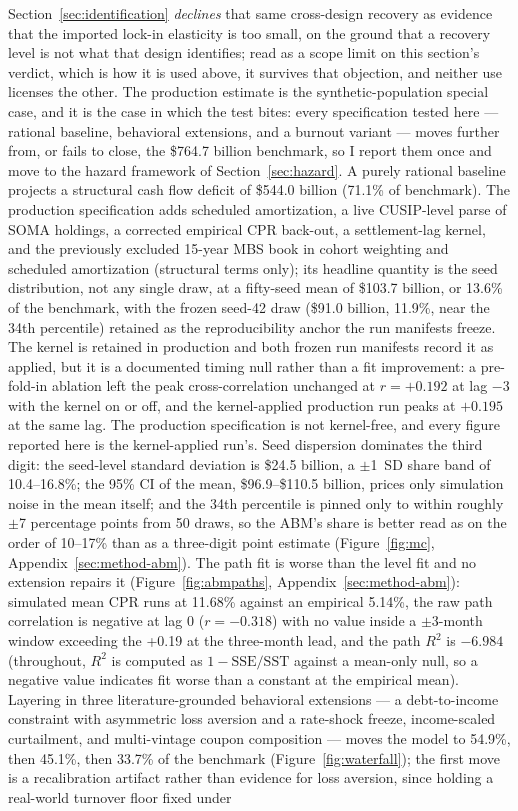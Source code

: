 \documentclass[12pt]{article}
\begin{document}
Section~\ref{sec:identification} \emph{declines} that same cross-design recovery as evidence that the imported lock-in elasticity is too small, on the ground that a recovery level is not what that design identifies; read as a scope limit on this section's verdict, which is how it is used above, it survives that objection, and neither use licenses the other. The production estimate is the synthetic-population special case, and it is the case in which the test bites: every specification tested here --- rational baseline, behavioral extensions, and a burnout variant --- moves further from, or fails to close, the \$764.7 billion benchmark, so I report them once and move to the hazard framework of Section~\ref{sec:hazard}. A purely rational baseline projects a structural cash flow deficit of \$544.0 billion (71.1\% of benchmark). The production specification adds scheduled amortization, a live CUSIP-level parse of SOMA holdings, a corrected empirical CPR back-out, a settlement-lag kernel, and the previously excluded 15-year MBS book in cohort weighting and scheduled amortization (structural terms only); its headline quantity is the seed distribution, not any single draw, at a fifty-seed mean of \$103.7 billion, or 13.6\% of the benchmark, with the frozen seed-42 draw (\$91.0 billion, 11.9\%, near the 34th percentile) retained as the reproducibility anchor the run manifests freeze. The kernel is retained in production and both frozen run manifests record it as applied, but it is a documented timing null rather than a fit improvement: a pre-fold-in ablation left the peak cross-correlation unchanged at $r = +0.192$ at lag $-3$ with the kernel on or off, and the kernel-applied production run peaks at $+0.195$ at the same lag. The production specification is not kernel-free, and every figure reported here is the kernel-applied run's. Seed dispersion dominates the third digit: the seed-level standard deviation is \$24.5 billion, a $\pm$1~SD share band of 10.4--16.8\%; the 95\% CI of the mean, \$96.9--\$110.5 billion, prices only simulation noise in the mean itself; and the 34th percentile is pinned only to within roughly $\pm$7 percentage points from 50 draws, so the ABM's share is better read as on the order of 10--17\% than as a three-digit point estimate (Figure~\ref{fig:mc}, Appendix~\ref{sec:method-abm}). The path fit is worse than the level fit and no extension repairs it (Figure~\ref{fig:abmpaths}, Appendix~\ref{sec:method-abm}): simulated mean CPR runs at 11.68\% against an empirical 5.14\%, the raw path correlation is negative at lag 0 ($r = -0.318$) with no value inside a $\pm$3-month window exceeding the +0.19 at the three-month lead, and the path $R^2$ is $-6.984$ (throughout, $R^2$ is computed as $1-\mathrm{SSE}/\mathrm{SST}$ against a mean-only null, so a negative value indicates fit worse than a constant at the empirical mean). Layering in three literature-grounded behavioral extensions --- a debt-to-income constraint with asymmetric loss aversion and a rate-shock freeze, income-scaled curtailment, and multi-vintage coupon composition --- moves the model to 54.9\%, then 45.1\%, then 33.7\% of the benchmark (Figure~\ref{fig:waterfall}); the first move is a recalibration artifact rather than evidence for loss aversion, since holding a real-world turnover floor fixed under 
\end{document}
